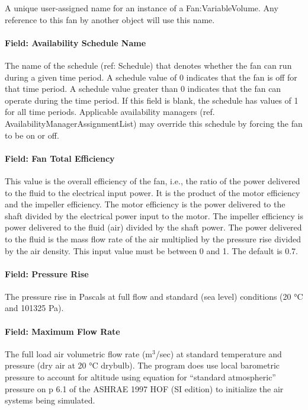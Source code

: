 A unique user-assigned name for an instance of a Fan:VariableVolume. Any reference to this fan by another object will use this name.

\paragraph{Field: Availability Schedule Name}\label{field-availability-schedule-name-2-002}

The name of the schedule (ref: Schedule) that denotes whether the fan can run during a given time period. A schedule value of 0 indicates that the fan is off for that time period. A schedule value greater than 0 indicates that the fan can operate during the time period. If this field is blank, the schedule has values of 1 for all time periods. Applicable availability managers (ref. AvailabilityManagerAssignmentList) may override this schedule by forcing the fan to be on or off.

\paragraph{Field: Fan Total Efficiency}\label{field-fan-total-efficiency-2}

This value is the overall efficiency of the fan, i.e., the ratio of the power delivered to the fluid to the electrical input power. It is the product of the motor efficiency and the impeller efficiency. The motor efficiency is the power delivered to the shaft divided by the electrical power input to the motor. The impeller efficiency is power delivered to the fluid (air) divided by the shaft power. The power delivered to the fluid is the mass flow rate of the air multiplied by the pressure rise divided by the air density. This input value must be between 0 and 1. The default is 0.7.

\paragraph{Field: Pressure Rise}\label{field-pressure-rise-2}

The pressure rise in Pascals at full flow and standard (sea level) conditions (20 °C and 101325 Pa).

\paragraph{Field: Maximum Flow Rate}\label{field-maximum-flow-rate-2}

The full load air volumetric flow rate (m\(^{3}\)/sec) at standard temperature and pressure (dry air at 20 °C drybulb). The program does use local barometric pressure to account for altitude using equation for ``standard atmospheric'' pressure on p 6.1 of the ASHRAE 1997 HOF (SI edition) to initialize the air systems being simulated.

